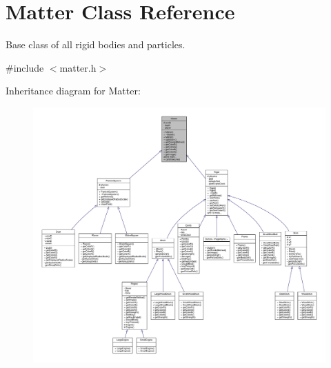 \hypertarget{classMatter}{}\section{Matter Class Reference}
\label{classMatter}


Base class of all rigid bodies and particles.  




{\ttfamily \#include $<$matter.\+h$>$}



Inheritance diagram for Matter\+:
\nopagebreak
\begin{figure}[H]
\begin{center}
\leavevmode
\includegraphics[width=350pt]{classMatter__inherit__graph}
\end{center}
\end{figure}


